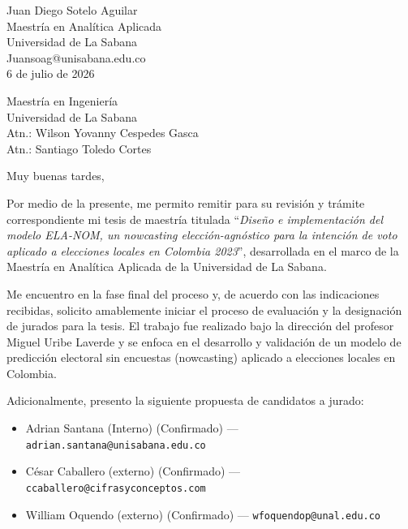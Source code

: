 \documentclass[11pt,letterpaper]{article}
\begin{document}
\begin{flushright}
    Juan Diego Sotelo Aguilar\\
    Maestría en Analítica Aplicada\\
    Universidad de La Sabana\\
    Juansoag@unisabana.edu.co\\[0.5cm]
    6 de julio de 2026
\end{flushright}

\vspace{0.4cm}

\begin{flushleft}
    Maestría en Ingeniería\\
    Universidad de La Sabana\\
    Atn.: Wilson Yovanny Cespedes Gasca\\
    Atn.: Santiago Toledo Cortes
\end{flushleft}

\vspace{0.3cm}

Muy buenas tardes,

Por medio de la presente, me permito remitir para su revisión y trámite correspondiente mi tesis de maestría titulada ``\textit{Diseño e implementación del modelo ELA-NOM, un nowcasting elección-agnóstico para la intención de voto aplicado a elecciones locales en Colombia 2023}'', desarrollada en el marco de la Maestría en Analítica Aplicada de la Universidad de La Sabana.

Me encuentro en la fase final del proceso y, de acuerdo con las indicaciones recibidas, solicito amablemente iniciar el proceso de evaluación y la designación de jurados para la tesis. El trabajo fue realizado bajo la dirección del profesor Miguel Uribe Laverde y se enfoca en el desarrollo y validación de un modelo de predicción electoral sin encuestas (nowcasting) aplicado a elecciones locales en Colombia.

Adicionalmente, presento la siguiente propuesta de candidatos a jurado:

\begin{itemize}
    \item Adrian Santana (Interno) (Confirmado) --- \texttt{adrian.santana@unisabana.edu.co}
    \item César Caballero (externo) (Confirmado) --- \texttt{ccaballero@cifrasyconceptos.com}
    \item William Oquendo (externo) (Confirmado) --- \texttt{wfoquendop@unal.edu.co}
\end{itemize}
\end{document}
